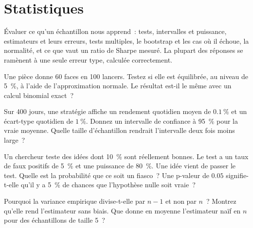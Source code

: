 \chapter{Statistiques}\label{ch:iv1:statistics}

\begin{ivtrains}
Évaluer ce qu'un échantillon nous apprend~: tests, intervalles et puissance, estimateurs et leurs erreurs, tests multiples, le bootstrap et les cas où il échoue, la normalité, et ce que vaut un ratio de Sharpe mesuré. La plupart des réponses se ramènent à une seule erreur type, calculée correctement.
\end{ivtrains}

\begin{question}\label{iq:iv1:statistics:1}
Une pièce donne 60 faces en 100 lancers. Testez si elle est équilibrée, au niveau de 5~\%, à l'aide de l'approximation normale. Le résultat est-il le même avec un calcul binomial exact~?
\end{question}

\begin{question}\label{iq:iv1:statistics:2}
Sur 400 jours, une stratégie affiche un rendement quotidien moyen de $0.1~\%$ et un écart-type quotidien de $1~\%$. Donnez un intervalle de confiance à 95~\% pour la vraie moyenne. Quelle taille d'échantillon rendrait l'intervalle deux fois moins large~?
\end{question}

\begin{question}\label{iq:iv1:statistics:3}
Un chercheur teste des idées dont 10~\% sont réellement bonnes. Le test a un taux de faux positifs de 5~\% et une puissance de 80~\%. Une idée vient de passer le test. Quelle est la probabilité que ce soit un fiasco~? Une p-valeur de $0.05$ signifie-t-elle qu'il y a 5~\% de chances que l'hypothèse nulle soit vraie~?
\end{question}

\begin{question}\label{iq:iv1:statistics:4}
Pourquoi la variance empirique divise-t-elle par $n - 1$ et non par $n$~? Montrez qu'elle rend l'estimateur sans biais. Que donne en moyenne l'estimateur naïf en $n$ pour des échantillons de taille 5~?
\end{question}

